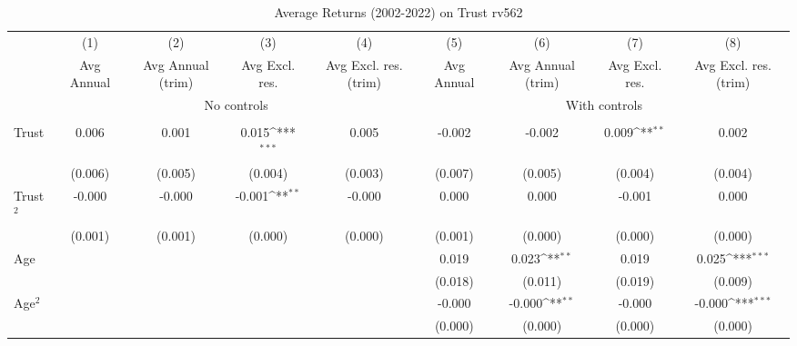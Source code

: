 \begin{table}[htbp]\centering
\def\sym#1{\ifmmode^{#1}\else\(^{#1}\)\fi}
\caption{Average Returns (2002-2022) on Trust rv562}
\begin{tabular}{l*{8}{c}}
\toprule
          &\multicolumn{1}{c}{(1)}&\multicolumn{1}{c}{(2)}&\multicolumn{1}{c}{(3)}&\multicolumn{1}{c}{(4)}&\multicolumn{1}{c}{(5)}&\multicolumn{1}{c}{(6)}&\multicolumn{1}{c}{(7)}&\multicolumn{1}{c}{(8)}\\
          &\multicolumn{1}{c}{Avg Annual}&\multicolumn{1}{c}{Avg Annual (trim)}&\multicolumn{1}{c}{Avg Excl. res.}&\multicolumn{1}{c}{Avg Excl. res. (trim)}&\multicolumn{1}{c}{Avg Annual}&\multicolumn{1}{c}{Avg Annual (trim)}&\multicolumn{1}{c}{Avg Excl. res.}&\multicolumn{1}{c}{Avg Excl. res. (trim)}\\
& \multicolumn{4}{c}{No controls} & \multicolumn{4}{c}{With controls} \\\\ \cmidrule(lr){2-5}\cmidrule(lr){6-9}
Trust     &    0.006         &    0.001         &    0.015\sym{***}&    0.005         &   -0.002         &   -0.002         &    0.009\sym{**} &    0.002         \\
          &  (0.006)         &  (0.005)         &  (0.004)         &  (0.003)         &  (0.007)         &  (0.005)         &  (0.004)         &  (0.004)         \\
Trust$^{2}$&   -0.000         &   -0.000         &   -0.001\sym{**} &   -0.000         &    0.000         &    0.000         &   -0.001         &    0.000         \\
          &  (0.001)         &  (0.001)         &  (0.000)         &  (0.000)         &  (0.001)         &  (0.000)         &  (0.000)         &  (0.000)         \\
Age       &                  &                  &                  &                  &    0.019         &    0.023\sym{**} &    0.019         &    0.025\sym{***}\\
          &                  &                  &                  &                  &  (0.018)         &  (0.011)         &  (0.019)         &  (0.009)         \\
Age$^{2}$ &                  &                  &                  &                  &   -0.000         &   -0.000\sym{**} &   -0.000         &   -0.000\sym{***}\\
          &                  &                  &                  &                  &  (0.000)         &  (0.000)         &  (0.000)         &  (0.000)         \\

\end{tabular}
\end{table}
